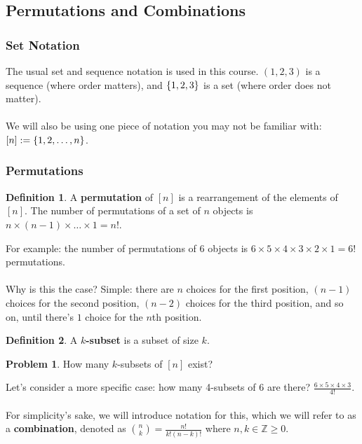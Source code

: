 \documentclass[]{article}
\theoremstyle{definition}
\newtheorem{problem}{Problem}[section]
\newtheorem*{defn}{Definition}
\DeclarePairedDelimiter{\set}{\lbrace}{\rbrace}
\begin{document}
		\subsection{Permutations and Combinations}
			\subsubsection{Set Notation}
				The usual set and sequence notation is used in this course. $(1, 2, 3)$ is a sequence (where order matters), and $\set{1, 2, 3}$ is a set (where order does not matter).
				\\ \\
				We will also be using one piece of notation you may not be familiar with: $[n] := \set{1, 2, \ldots, n}$.

			\subsubsection{Permutations}
				\begin{defn}
					A \textbf{permutation} of $[n]$ is a rearrangement of the elements of $[n]$. The number of permutations of a set of $n$ objects is $n \times (n - 1) \times \ldots \times 1 = n!$.
				\end{defn}

				For example: the number of permutations of $6$ objects is $6 \times 5 \times 4 \times 3 \times 2 \times 1 = 6!$ permutations.
				\\ \\
				Why is this the case? Simple: there are $n$ choices for the first position, $(n - 1)$ choices for the second position, $(n - 2)$ choices for the third position, and so on, until there's $1$ choice for the $n$th position.

				\begin{defn}
					A \textbf{$k$-subset} is a subset of size $k$.
				\end{defn}

				\begin{problem}
					How many $k$-subsets of $[n]$ exist?
				\end{problem}

				Let's consider a more specific case: how many 4-subsets of 6 are there? $\frac{6 \times 5 \times 4 \times 3}{4!}$.
				\\ \\
				For simplicity's sake, we will introduce notation for this, which we will refer to as a \textbf{combination}, denoted as
					$\binom{n}{k} = \frac{n!}{k!(n-k)!}$ where $n, k \in \mathbb{Z} \ge 0$.
\end{document}
